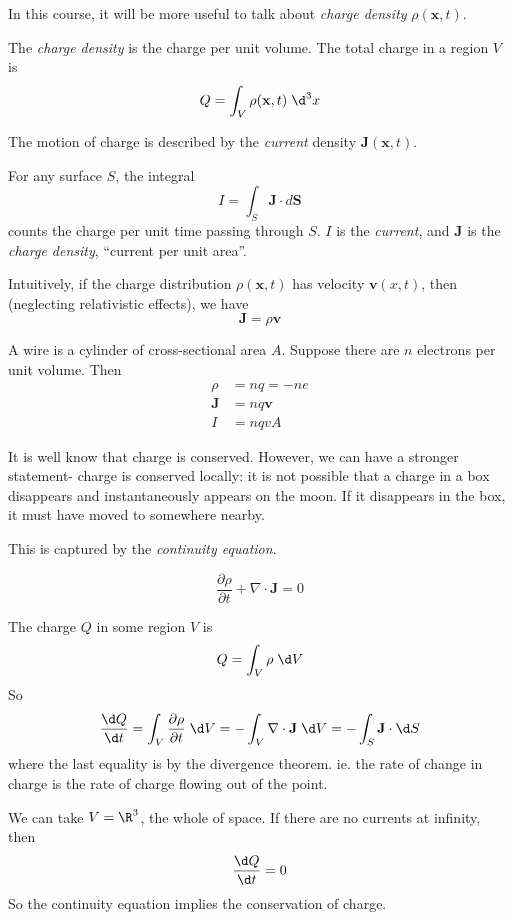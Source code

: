 \documentclass[a4paper]{article}
\begin{document}
In this course, it will be more useful to talk about \emph{charge density} $\rho(\mathbf{x}, t)$.
\begin{defi}
  The \emph{charge density} is the charge per unit volume. The total charge in a region $V$ is
  \[
    Q = \int_V \rho(\mathbf{x}, t)\; \d^3 x
  \]
\end{defi}

The motion of charge is described by the \emph{current} density $\mathbf{J}(\mathbf{x}, t)$.
\begin{defi}
For any surface $S$, the integral
\[
  I = \int_S \mathbf{J}\cdot d\mathbf{S}
\]
counts the charge per unit time passing through $S$. $I$ is the \emph{current}, and $\mathbf{J}$ is the \emph{charge density}, ``current per unit area''.
\end{defi}
Intuitively, if the charge distribution $\rho (\mathbf{x}, t)$ has velocity $\mathbf{v}(x, t)$, then (neglecting relativistic effects), we have
\[
  \mathbf{J} = \rho \mathbf{v}
\]

\begin{eg}
  A wire is a cylinder of cross-sectional area $A$. Suppose there are $n$ electrons per unit volume. Then
  \begin{align*}
    \rho &= nq = -ne\\
    \mathbf{J} &= nq\mathbf{v}\\
    I &= nqvA
  \end{align*}
\end{eg}

It is well know that charge is conserved. However, we can have a stronger statement- charge is conserved locally: it is not possible that a charge in a box disappears and instantaneously appears on the moon. If it disappears in the box, it must have moved to somewhere nearby.

This is captured by the \emph{continuity equation}.
\begin{law}
  \[
    \frac{\partial\rho}{\partial t} + \nabla\cdot \mathbf{J} = 0
  \]
\end{law}
The charge $Q$ in some region $V$ is
\[
  Q = \int_V \rho \;\d V
\]
So
\[
  \frac{\d Q}{\d t} = \int_V \frac{\partial\rho}{\partial t}\; \d V = -\int_V \nabla\cdot \mathbf{J}\; \d V = -\int_S \mathbf{J}\cdot \d S
\]
where the last equality is by the divergence theorem. ie. the rate of change in charge is the rate of charge flowing out of the point.

We can take $V = \R^3$, the whole of space. If there are no currents at infinity, then
\[
  \frac{\d Q}{\d t} = 0
\]
So the continuity equation implies the conservation of charge.
\end{document}
